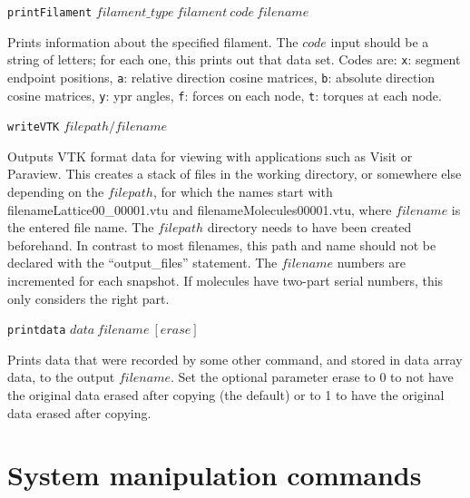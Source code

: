 \documentclass {scrbook}
\newcommand {\ttt} {\texttt}
\begin{document}
\begin{description}
\item{\ttt{printFilament} $filament\_type\ filament\ code\ filename$}

Prints information about the specified filament. The $code$ input should be a string of letters; for each one, this prints out that data set. Codes are: \ttt{x}: segment endpoint positions, \ttt{a}: relative direction cosine matrices, \ttt{b}: absolute direction cosine matrices, \ttt{y}: ypr angles, \ttt{f}: forces on each node, \ttt{t}: torques at each node.

\item{\ttt{writeVTK} $filepath/filename$}

Outputs VTK format data for viewing with applications such as Visit or Paraview. This creates a stack of files in the working directory, or somewhere else depending on the $filepath$, for which the names start with filenameLattice00\_00001.vtu and filenameMolecules00001.vtu, where $filename$ is the entered file name. The $filepath$ directory needs to have been created beforehand. In contrast to most filenames, this path and name should not be declared with the ``output\_files'' statement. The $filename$ numbers are incremented for each snapshot. If molecules have two-part serial numbers, this only considers the right part.

\item{\ttt{printdata} $data\ filename\ [erase]$}

Prints data that were recorded by some other command, and stored in data array data, to the output $filename$. Set the optional parameter erase to 0 to not have the original data erased after copying (the default) or to 1 to have the original data erased after copying.

\end{description}

\section{System manipulation commands}
\end{document}
